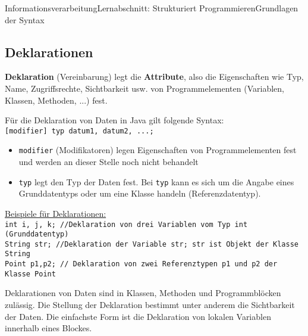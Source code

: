 \documentclass[11pt,oneside,openany,headings=optiontotoc,11pt,numbers=noenddot]{article}
\begin{document}
\begin{worksheet}{Informationsverarbeitung}{Lernabschnitt: Strukturiert Programmieren}{Grundlagen der Syntax}
		\subsection{Deklarationen}
		\textbf{Deklaration} (Vereinbarung) legt die \textbf{Attribute}, also die Eigenschaften wie Typ, Name, Zugriffsrechte, Sichtbarkeit usw. von Programmelementen (Variablen, Klassen, Methoden, ...) fest.\\
		\par\noindent
		Für die Deklaration von Daten in Java gilt folgende Syntax:\\
		\lstinline[style=JavaInputStyle]|[modifier] typ datum1, datum2, ...;|
		\begin{itemize}
			\item {\lstinline[style=JavaInputStyle]|modifier|} (Modifikatoren) legen Eigenschaften von Programmelementen fest und werden an dieser Stelle noch nicht behandelt
			\item {\lstinline[style=JavaInputStyle]|typ|} legt den Typ der Daten fest. Bei {\lstinline[style=JavaInputStyle]|typ|} kann es sich um die Angabe eines Grunddatentyps oder um eine Klasse handeln (Referenzdatentyp).
		\end{itemize}
		\underline{Beispiele für Deklarationen:}\\
		\lstinline[style=JavaInputStyle]|int i, j, k; //Deklaration von drei Variablen vom Typ int (Grunddatentyp)|\\
		\lstinline[style=JavaInputStyle]|String str; //Deklaration der Variable str; str ist Objekt der Klasse String|\\
		\lstinline[style=JavaInputStyle]|Point p1,p2; // Deklaration von zwei Referenztypen p1 und p2 der Klasse Point|\\
		\par\noindent
		Deklarationen von Daten sind in Klassen, Methoden und Programmblöcken zulässig. Die Stellung der Deklaration bestimmt unter anderem die Sichtbarkeit der Daten. Die einfachste Form ist die Deklaration von lokalen Variablen innerhalb eines Blockes.
		

\end{worksheet}
\end{document}
